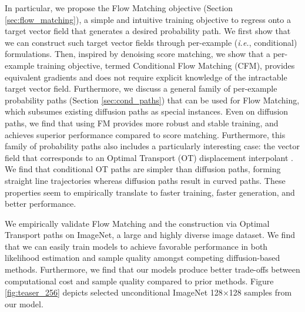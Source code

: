 \documentclass{article}
\makeatletter
\renewcommand*{\ie}{{\it i.e.}\@\xspace}
\makeatother
\begin{document}
In particular, we propose the Flow Matching objective (Section \ref{sec:flow_matching}), a simple and intuitive training objective to regress onto a target vector field that generates a desired probability path. 
We first show that we can construct such target vector fields through per-example (\ie, conditional) formulations. 
Then, inspired by denoising score matching, we show that a per-example training objective, termed Conditional Flow Matching (CFM), provides equivalent gradients and does not require explicit knowledge of the intractable target vector field.
Furthermore, we discuss a general family of per-example probability paths (Section \ref{sec:cond_paths}) that can be used for Flow Matching, which subsumes existing diffusion paths as special instances. 
Even on diffusion paths, we find that using FM provides more robust and stable training, and achieves superior performance compared to score matching.
Furthermore, this family of probability paths also includes a particularly interesting case: the vector field that corresponds to an Optimal Transport (OT) displacement interpolant \citep{mccann1997convexity}. We find that conditional OT paths are simpler than diffusion paths, forming straight line trajectories whereas diffusion paths result in curved paths. These properties seem to empirically translate to faster training, faster generation, and better performance. 

We empirically validate Flow Matching and the construction via Optimal Transport paths on ImageNet, a large and highly diverse image dataset. We find that we can easily train models to achieve favorable performance in both likelihood estimation and sample quality amongst competing diffusion-based methods. Furthermore, we find that our models produce better trade-offs between computational cost and sample quality compared to prior methods. Figure \ref{fig:teaser_256} depicts selected unconditional ImageNet 128$\times$128 samples from our model. 

\end{document}
